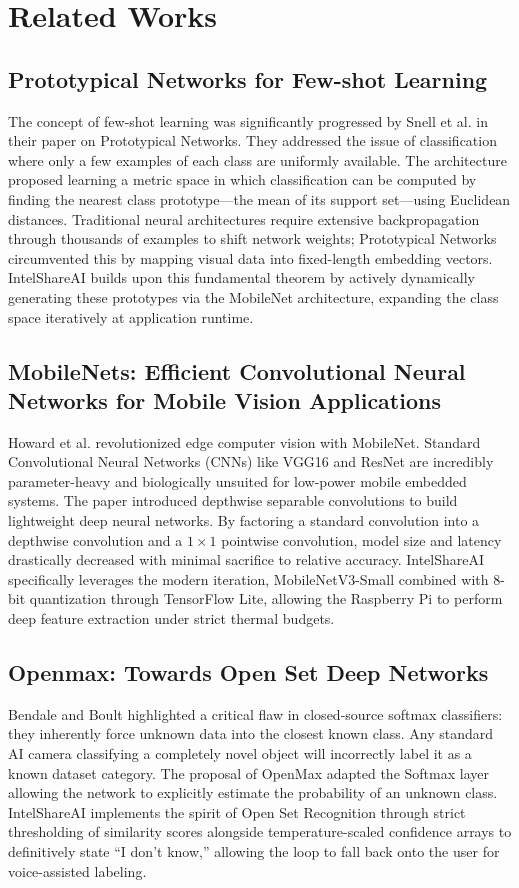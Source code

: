 \documentclass[12pt,a4paper]{report}
\begin{document}
\section{Related Works}

\subsection{Prototypical Networks for Few-shot Learning}
The concept of few-shot learning was significantly progressed by Snell et al. \cite{snell2017} in their paper on Prototypical Networks. They addressed the issue of classification where only a few examples of each class are uniformly available. The architecture proposed learning a metric space in which classification can be computed by finding the nearest class prototype---the mean of its support set---using Euclidean distances. Traditional neural architectures require extensive backpropagation through thousands of examples to shift network weights; Prototypical Networks circumvented this by mapping visual data into fixed-length embedding vectors. IntelShareAI builds upon this fundamental theorem by actively dynamically generating these prototypes via the MobileNet architecture, expanding the class space iteratively at application runtime.

\subsection{MobileNets: Efficient Convolutional Neural Networks for Mobile Vision Applications}
Howard et al. \cite{howard2017} revolutionized edge computer vision with MobileNet. Standard Convolutional Neural Networks (CNNs) like VGG16 and ResNet are incredibly parameter-heavy and biologically unsuited for low-power mobile embedded systems. The paper introduced depthwise separable convolutions to build lightweight deep neural networks. By factoring a standard convolution into a depthwise convolution and a $1 \times 1$ pointwise convolution, model size and latency drastically decreased with minimal sacrifice to relative accuracy. IntelShareAI specifically leverages the modern iteration, MobileNetV3-Small combined with 8-bit quantization through TensorFlow Lite, allowing the Raspberry Pi to perform deep feature extraction under strict thermal budgets.

\subsection{Openmax: Towards Open Set Deep Networks}
Bendale and Boult \cite{bendale2016} highlighted a critical flaw in closed-source softmax classifiers: they inherently force unknown data into the closest known class. Any standard AI camera classifying a completely novel object will incorrectly label it as a known dataset category. The proposal of OpenMax adapted the Softmax layer allowing the network to explicitly estimate the probability of an unknown class. IntelShareAI implements the spirit of Open Set Recognition through strict thresholding of similarity scores alongside temperature-scaled confidence arrays to definitively state ``I don't know,'' allowing the loop to fall back onto the user for voice-assisted labeling.
\end{document}

